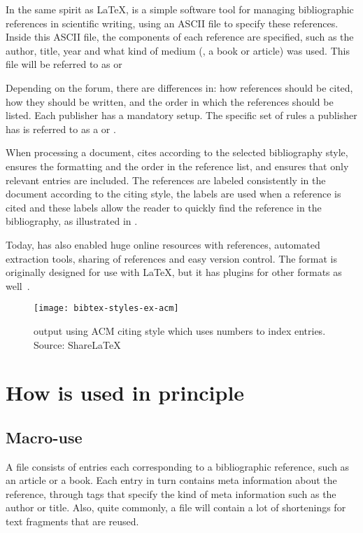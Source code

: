 In the same spirit as {\LaTeX}, {\bibtex} is a simple software tool
for managing bibliographic references in scientific writing, using an
ASCII file to specify these references.  Inside this ASCII file, the
components of each reference are specified, such as the author, title,
year and what kind of medium (\eg, a book or article) was used.  This
file will be referred to as  or

Depending on the forum, there are differences in: how references
should be cited, how they should be written, and the order in which
the references should be listed.  Each publisher has a mandatory
setup.  The specific set of rules a publisher has is referred to as a
 or .

When processing a document, {\bibtex} cites according to the selected
bibliography style, ensures the formatting and the order in the
reference list, and ensures that only relevant entries are included.
The references are labeled consistently in the document according to
the citing style, the labels are used when a reference is cited and
these labels allow the reader to quickly find the reference in the
bibliography, as illustrated in .

Today, {\bibtex} has also enabled huge online resources with
references, automated extraction tools, sharing of references and easy
version control.  The {\bibtex} format is originally designed for use
with {\LaTeX}, but it has plugins for other formats as
well~\cite{bibtex_resource}.

\begin{figure}
  \centering
  \texttt{[image: bibtex-styles-ex-acm]}
  \caption{{\bibtex} output using ACM citing style which uses numbers to
    index entries.  Source: ShareLaTeX~\cite{sharelatex2016_styles}}
\label{fig:bibtex_example_acm}
\end{figure}

\section{How {\bibtex} is used in principle}
\label{sec:practice_of_bibtex}

\subsection{Macro-use}

A {\bibtex} file consists of entries each corresponding to a
bibliographic reference, such as an article or a book.  Each entry in
turn contains meta information about the reference, through tags that
specify the kind of meta information such as the author or title.
Also, quite commonly, a file will contain a lot of shortenings for
text fragments that are reused.


